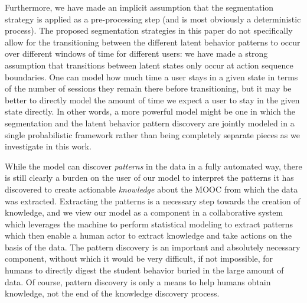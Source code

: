 Furthermore, we have made an implicit assumption that the segmentation
strategy is applied as a pre-processing step (and is most obviously a
deterministic process). The proposed segmentation strategies in this paper
do not specifically allow for the transitioning between the different
latent behavior patterns to occur over different windows of time for
different users: we have made a strong assumption that transitions between
latent states only occur at action sequence boundaries. One can model how
much time a user stays in a given state in terms of the number of sessions
they remain there before transitioning, but it may be better to directly
model the amount of time we expect a user to stay in the given state
directly. In other words, a more powerful model might be one in which the
segmentation and the latent behavior pattern discovery are jointly modeled
in a single probabilistic framework rather than being completely separate
pieces as we investigate in this work.

While the model can discover \emph{patterns} in the data in a fully
automated way, there is still clearly a burden on the user of our model to
interpret the patterns it has discovered to create actionable
\emph{knowledge} about the MOOC from which the data was extracted.
Extracting the patterns is a necessary step towards the creation of
knowledge, and we view our model as a component in a collaborative system
which leverages the machine to perform statistical modeling to extract
patterns which then enable a human actor to extract knowledge and take
actions on the basis of the data. The pattern discovery is an important and
absolutely necessary component, without which it would be very difficult,
if not impossible, for humans to directly digest the student behavior
buried in the large amount of data.  Of course, pattern discovery is only a
means to help humans obtain knowledge, not the end of the knowledge
discovery process.
